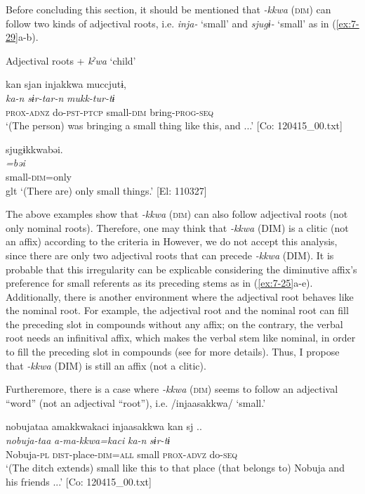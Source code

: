  Before concluding this section, it should be mentioned that \textit{{}-kkwa} (\textsc{dim}) can follow two kinds of adjectival roots, i.e. \textit{inja-} ‘small’ and \textit{sjugɨ-} ‘small’ as in (\ref{ex:7-29}a-b).

\ea \label{ex:7:29}  Adjectival roots + \textit{kˀwa} ‘child’

\ea \label{ex:7:a}{\TM}
\glll  kan  sjan  injakkwa  muccjutɨ,\\
\textit{ka-n}  \textit{sɨr-tar-n}  \textit{}  \textit{mukk-tur-tɨ}\\
\textsc{prox}-\textsc{adnz}  do-\textsc{pst}-\textsc{ptcp}  small-\textsc{dim}  bring-\textsc{prog}-\textsc{seq}\\
\glt ‘(The person) was bringing a small thing like this, and ...’ [Co: 120415\_00.txt]

\ex \label{ex:7:b}{\TM}
\glll  sjugɨkkwabəi.\\
\textit{=bəi}\\
small-\textsc{dim}=only\\
glt ‘(There are) only small things.’ [El: 110327]

\z
\z

The above examples show that \textit{{}-kkwa} (\textsc{dim}) can also follow adjectival roots (not only nominal roots). Therefore, one may think that \textit{{}-kkwa} (DIM) is a clitic (not an affix) according to the criteria in  However, we do not accept this analysis, since there are only two adjectival roots that can precede \textit{-kkwa} (DIM). It is probable that this irregularity can be explicable considering the diminutive affix’s preference for small referents as its preceding stems as in (\ref{ex:7-25}a-e). Additionally, there is another environment where the adjectival root behaves like the nominal root. For example, the adjectival root and the nominal root can fill the preceding slot in compounds without any affix; on the contrary, the verbal root needs an infinitival affix, which makes the verbal stem like nominal, in order to fill the preceding slot in compounds (see  for more details). Thus, I propose that \textit{{}-kkwa} (DIM) is still an affix (not a clitic).

Furtheremore, there is a case where \textit{{}-kkwa} (\textsc{dim}) seems to follow an adjectival “word” (not an adjectival “root”), i.e. /injaasakkwa/ ‘small.’

\ea \label{ex:7:30}{\TM}
\glll  nobujataa  amakkwakaci  injaasakkwa  kan  sj ..\\
\textit{nobuja-taa}  \textit{a-ma-kkwa=kaci}  \textit{}  \textit{ka-n}  \textit{sɨr-tɨ}\\
Nobuja-\textsc{pl}  \textsc{dist}-place-\textsc{dim}=\textsc{all}  small  \textsc{prox}-\textsc{advz}  do-\textsc{seq}\\
\glt ‘(The ditch extends) small like this to that place (that belongs to) Nobuja and his friends ...’ [Co: 120415\_00.txt]


